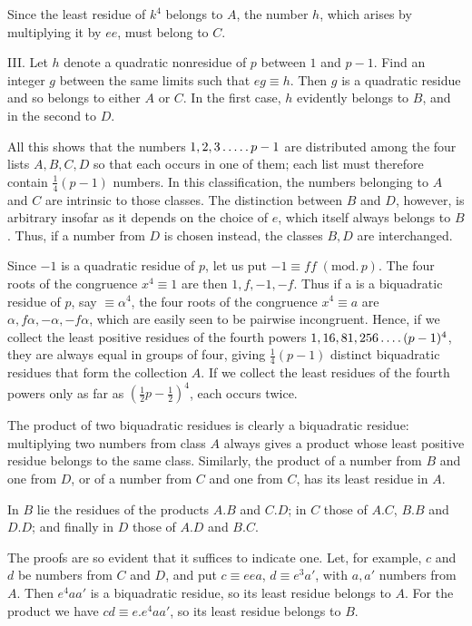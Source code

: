 Since the least residue of $k^4$ belongs to $A$, the number $h$, which arises by multiplying it by $ee$, must belong to $C$.

III. Let $h$ denote a quadratic nonresidue of $p$ between $1$ and $p-1$. Find an integer $g$ between the same limits such that $eg\equiv h$. Then $g$ is a quadratic residue and so belongs to either $A$ or $C$. In the first case, $h$ evidently belongs to $B$, and in the second to $D$.

All this shows that the numbers $1,2,3\mathinner{.\,.\,.\,.\,.} p-1$ are distributed among the four lists $A,B,C,D$ so that each occurs in one of them; each list must therefore contain $\tfrac14(p-1)$ numbers. In this classification, the numbers belonging to $A$ and $C$ are intrinsic to those classes. The distinction between $B$ and $D$, however, is arbitrary insofar as it depends on the choice of $e$, which itself always belongs to $B$. Thus, if a number from $D$ is chosen instead, the classes $B,D$ are interchanged.

Since $-1$ is a quadratic residue of $p$, let us put $-1\equiv ff\; (\mathrm{mod.}\,p)$. The four roots of the congruence $x^4\equiv1$ are then $1,f,-1,-f$. Thus if\space%
%
a is a biquadratic residue of $p$, say $\equiv\alpha^4$, the four roots of the congruence $x^4\equiv a$ are $\alpha,f\alpha,-\alpha,-f\alpha$, which are easily seen to be pairwise incongruent. Hence, if we collect the least positive residues of the fourth powers $1,16,81,256\mathinner{.\,.\,.\,.}(p-1)^4$, they are always equal in groups of four, giving $\tfrac14(p-1)$ distinct biquadratic residues that form the collection $A$. If we collect the least residues of the fourth powers only as far as $(\tfrac12p-\tfrac12)^4$, each occurs twice.

The product of two biquadratic residues is clearly a biquadratic residue: multiplying two numbers from class $A$ always gives a product whose least positive residue belongs to the same class. Similarly, the product of a number from $B$ and one from $D$, or of a number from $C$ and one from $C$, has its least residue in $A$.

In $B$ lie the residues of the products $A.B$ and $C.D$; in $C$ those of $A.C$, $B.B$ and $D.D$; and finally in $D$ those of $A.D$ and $B.C$.

The proofs are so evident that it suffices to indicate one. Let, for example, $c$ and $d$ be numbers from $C$ and $D$, and put $c\equiv eea$, $d\equiv e^3a'$, with $a,a'$ numbers from $A$. Then $e^4aa'$ is a biquadratic residue, so its least residue belongs to $A$. For the product we have $cd$\relax$\equiv e.e^4aa'$, so its least residue belongs to $B$.

